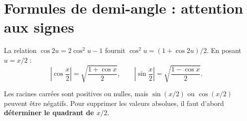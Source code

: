 \documentclass[../cours_spe_trigo.tex]{subfiles}
\begin{document}
\section{Formules de demi-angle : attention aux signes}
La relation $\cos2u=2\cos^2u-1$ fournit $\cos^2u=(1+\cos2u)/2$. En posant $u=x/2$ :
\[
\boxed{\left|\cos\frac x2\right|=\sqrt{\frac{1+\cos x}{2}},\qquad
\left|\sin\frac x2\right|=\sqrt{\frac{1-\cos x}{2}}.}
\]
\begin{attention}
Les racines carrées sont positives ou nulles, mais $\sin(x/2)$ ou $\cos(x/2)$ peuvent être négatifs. Pour supprimer les valeurs absolues, il faut d'abord \textbf{déterminer le quadrant de $x/2$}.
\end{attention}
\end{document}
